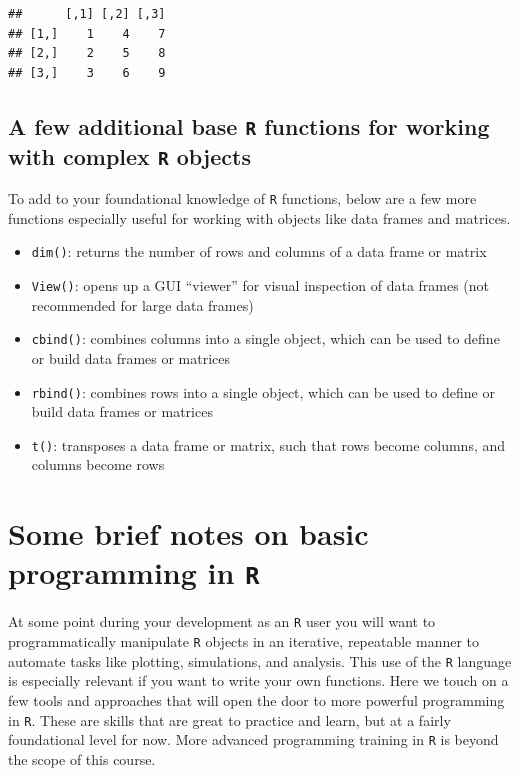 \documentclass[]{book}
\begin{document}
\begin{verbatim}
##      [,1] [,2] [,3]
## [1,]    1    4    7
## [2,]    2    5    8
## [3,]    3    6    9
\end{verbatim}

\hypertarget{a-few-additional-base-r-functions-for-working-with-complex-r-objects}{%
\subsection{\texorpdfstring{A few additional base \texttt{R} functions for working with complex \texttt{R} objects}{A few additional base R functions for working with complex R objects}}\label{a-few-additional-base-r-functions-for-working-with-complex-r-objects}}

To add to your foundational knowledge of \texttt{R} functions, below are a few more functions especially useful for working with objects like data frames and matrices.

\begin{itemize}
\item
  \texttt{dim()}: returns the number of rows and columns of a data frame or matrix
\item
  \texttt{View()}: opens up a GUI ``viewer'' for visual inspection of data frames (not recommended for large data frames)
\item
  \texttt{cbind()}: combines columns into a single object, which can be used to define or build data frames or matrices
\item
  \texttt{rbind()}: combines rows into a single object, which can be used to define or build data frames or matrices
\item
  \texttt{t()}: transposes a data frame or matrix, such that rows become columns, and columns become rows
\end{itemize}

\hypertarget{some-brief-notes-on-basic-programming-in-r}{%
\section{\texorpdfstring{Some brief notes on basic programming in \texttt{R}}{Some brief notes on basic programming in R}}\label{some-brief-notes-on-basic-programming-in-r}}

At some point during your development as an \texttt{R} user you will want to programmatically manipulate \texttt{R} objects in an iterative, repeatable manner to automate tasks like plotting, simulations, and analysis. This use of the \texttt{R} language is especially relevant if you want to write your own functions. Here we touch on a few tools and approaches that will open the door to more powerful programming in \texttt{R}. These are skills that are great to practice and learn, but at a fairly foundational level for now. More advanced programming training in \texttt{R} is beyond the scope of this course.
\end{document}
